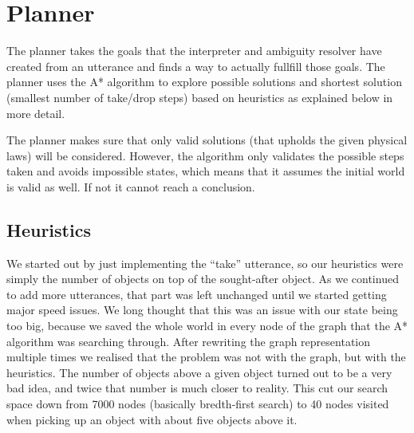 \section*{Planner}
The planner takes the goals that the interpreter and ambiguity resolver have
created from an utterance and finds a way to actually fullfill those goals. The
planner uses the A* algorithm to explore possible solutions and shortest
solution (smallest number of take/drop steps) based on heuristics as explained
below in more detail.

The planner makes sure that only valid solutions (that upholds the given
physical laws) will be considered. However, the algorithm only validates the
possible steps taken and avoids impossible states, which means that it assumes
the initial world is valid as well. If not it cannot reach a conclusion.

\subsection*{Heuristics}
We started out by just implementing the ``take'' utterance, so our heuristics
were simply the number of objects on top of the sought-after object. As we
continued to add more utterances, that part was left unchanged until we started
getting major speed issues. We long thought that this was an issue with our
state being too big, because we saved the whole world in every node of the
graph that the A* algorithm was searching through. After rewriting the graph
representation multiple times we realised that the problem was not with the
graph, but with the heuristics. The number of objects above a given object
turned out to be a very bad idea, and twice that number is much closer to
reality. This cut our search space down from 7000 nodes (basically bredth-first
search) to 40 nodes visited when picking up an object with about five objects
above it.

